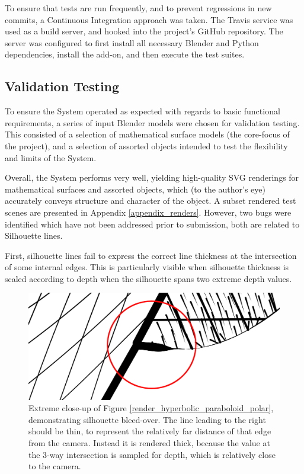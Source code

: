 To ensure that tests are run frequently, and to prevent regressions in new commits, a Continuous Integration approach was taken.
The Travis service was used as a build server, and hooked into the project's GitHub repository.
The server was configured to first install all necessary Blender and Python dependencies, install the add-on, and then execute the test suites.



\subsection{Validation Testing}

To ensure the System operated as expected with regards to basic functional requirements, a series of input Blender models were chosen for validation testing.
This consisted of a selection of mathematical surface models (the core-focus of the project), and a selection of assorted objects intended to test the flexibility and limits of the System.

Overall, the System performs very well, yielding high-quality SVG renderings for mathematical surfaces and assorted objects, which (to the author's eye) accurately conveys structure and character of the object. A subset rendered test scenes are presented in Appendix \ref{appendix_renders}. However, two bugs were identified which have not been addressed prior to submission, both are related to Silhouette lines.

First, silhouette lines fail to express the correct line thickness at the intersection of some internal edges. This is particularly visible when silhouette thickness is scaled according to depth when the silhouette spans two extreme depth values.

\begin{figure}[h!]
	\centering
	\includegraphics[width=\textwidth]{images/silhouette_bug.png}
	\caption{Extreme close-up of Figure \ref{render_hyperbolic_paraboloid_polar}, demonstrating silhouette bleed-over. The line leading to the right should be thin, to represent the relatively far distance of that edge from the camera. Instead it is rendered thick, because the value at the 3-way intersection is sampled for depth, which is relatively close to the camera.}\label{silhouette_bug}
\end{figure}

